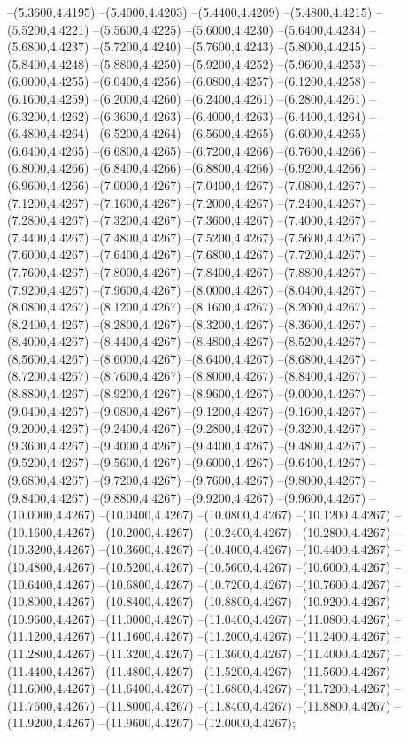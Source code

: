 {	--(5.3600,4.4195)
	--(5.4000,4.4203)
	--(5.4400,4.4209)
	--(5.4800,4.4215)
	--(5.5200,4.4221)
	--(5.5600,4.4225)
	--(5.6000,4.4230)
	--(5.6400,4.4234)
	--(5.6800,4.4237)
	--(5.7200,4.4240)
	--(5.7600,4.4243)
	--(5.8000,4.4245)
	--(5.8400,4.4248)
	--(5.8800,4.4250)
	--(5.9200,4.4252)
	--(5.9600,4.4253)
	--(6.0000,4.4255)
	--(6.0400,4.4256)
	--(6.0800,4.4257)
	--(6.1200,4.4258)
	--(6.1600,4.4259)
	--(6.2000,4.4260)
	--(6.2400,4.4261)
	--(6.2800,4.4261)
	--(6.3200,4.4262)
	--(6.3600,4.4263)
	--(6.4000,4.4263)
	--(6.4400,4.4264)
	--(6.4800,4.4264)
	--(6.5200,4.4264)
	--(6.5600,4.4265)
	--(6.6000,4.4265)
	--(6.6400,4.4265)
	--(6.6800,4.4265)
	--(6.7200,4.4266)
	--(6.7600,4.4266)
	--(6.8000,4.4266)
	--(6.8400,4.4266)
	--(6.8800,4.4266)
	--(6.9200,4.4266)
	--(6.9600,4.4266)
	--(7.0000,4.4267)
	--(7.0400,4.4267)
	--(7.0800,4.4267)
	--(7.1200,4.4267)
	--(7.1600,4.4267)
	--(7.2000,4.4267)
	--(7.2400,4.4267)
	--(7.2800,4.4267)
	--(7.3200,4.4267)
	--(7.3600,4.4267)
	--(7.4000,4.4267)
	--(7.4400,4.4267)
	--(7.4800,4.4267)
	--(7.5200,4.4267)
	--(7.5600,4.4267)
	--(7.6000,4.4267)
	--(7.6400,4.4267)
	--(7.6800,4.4267)
	--(7.7200,4.4267)
	--(7.7600,4.4267)
	--(7.8000,4.4267)
	--(7.8400,4.4267)
	--(7.8800,4.4267)
	--(7.9200,4.4267)
	--(7.9600,4.4267)
	--(8.0000,4.4267)
	--(8.0400,4.4267)
	--(8.0800,4.4267)
	--(8.1200,4.4267)
	--(8.1600,4.4267)
	--(8.2000,4.4267)
	--(8.2400,4.4267)
	--(8.2800,4.4267)
	--(8.3200,4.4267)
	--(8.3600,4.4267)
	--(8.4000,4.4267)
	--(8.4400,4.4267)
	--(8.4800,4.4267)
	--(8.5200,4.4267)
	--(8.5600,4.4267)
	--(8.6000,4.4267)
	--(8.6400,4.4267)
	--(8.6800,4.4267)
	--(8.7200,4.4267)
	--(8.7600,4.4267)
	--(8.8000,4.4267)
	--(8.8400,4.4267)
	--(8.8800,4.4267)
	--(8.9200,4.4267)
	--(8.9600,4.4267)
	--(9.0000,4.4267)
	--(9.0400,4.4267)
	--(9.0800,4.4267)
	--(9.1200,4.4267)
	--(9.1600,4.4267)
	--(9.2000,4.4267)
	--(9.2400,4.4267)
	--(9.2800,4.4267)
	--(9.3200,4.4267)
	--(9.3600,4.4267)
	--(9.4000,4.4267)
	--(9.4400,4.4267)
	--(9.4800,4.4267)
	--(9.5200,4.4267)
	--(9.5600,4.4267)
	--(9.6000,4.4267)
	--(9.6400,4.4267)
	--(9.6800,4.4267)
	--(9.7200,4.4267)
	--(9.7600,4.4267)
	--(9.8000,4.4267)
	--(9.8400,4.4267)
	--(9.8800,4.4267)
	--(9.9200,4.4267)
	--(9.9600,4.4267)
	--(10.0000,4.4267)
	--(10.0400,4.4267)
	--(10.0800,4.4267)
	--(10.1200,4.4267)
	--(10.1600,4.4267)
	--(10.2000,4.4267)
	--(10.2400,4.4267)
	--(10.2800,4.4267)
	--(10.3200,4.4267)
	--(10.3600,4.4267)
	--(10.4000,4.4267)
	--(10.4400,4.4267)
	--(10.4800,4.4267)
	--(10.5200,4.4267)
	--(10.5600,4.4267)
	--(10.6000,4.4267)
	--(10.6400,4.4267)
	--(10.6800,4.4267)
	--(10.7200,4.4267)
	--(10.7600,4.4267)
	--(10.8000,4.4267)
	--(10.8400,4.4267)
	--(10.8800,4.4267)
	--(10.9200,4.4267)
	--(10.9600,4.4267)
	--(11.0000,4.4267)
	--(11.0400,4.4267)
	--(11.0800,4.4267)
	--(11.1200,4.4267)
	--(11.1600,4.4267)
	--(11.2000,4.4267)
	--(11.2400,4.4267)
	--(11.2800,4.4267)
	--(11.3200,4.4267)
	--(11.3600,4.4267)
	--(11.4000,4.4267)
	--(11.4400,4.4267)
	--(11.4800,4.4267)
	--(11.5200,4.4267)
	--(11.5600,4.4267)
	--(11.6000,4.4267)
	--(11.6400,4.4267)
	--(11.6800,4.4267)
	--(11.7200,4.4267)
	--(11.7600,4.4267)
	--(11.8000,4.4267)
	--(11.8400,4.4267)
	--(11.8800,4.4267)
	--(11.9200,4.4267)
	--(11.9600,4.4267)
	--(12.0000,4.4267);
}
